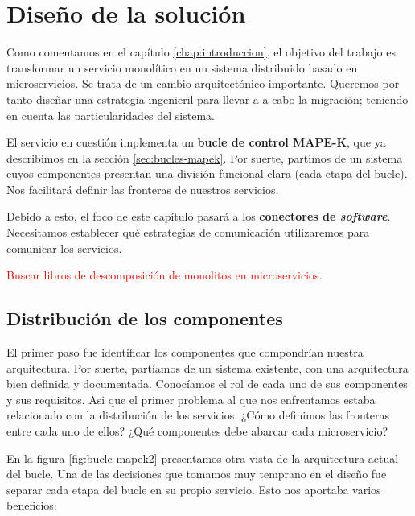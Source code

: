 \chapter{Diseño de la solución}
\label{chap:diseño}

Como comentamos en el capítulo \ref{chap:introduccion}, el objetivo del trabajo es transformar un servicio monolítico en un sistema distribuido basado en microservicios. Se trata de un cambio arquitectónico importante. Queremos por tanto diseñar una estrategia ingenieril para llevar a a cabo la migración; teniendo en cuenta las particularidades del sistema.

El servicio en cuestión implementa un \textbf{bucle de control MAPE-K}\cite{ibmcorporationArchitecturalBlueprintAutonomic2006,fonsServiciosAdaptivereadyPara2021}, que ya describimos en la sección \ref{sec:bucles-mapek}. Por suerte, partimos de un sistema cuyos componentes presentan una división funcional clara (cada etapa del bucle). Nos facilitará definir las fronteras de nuestros servicios.

Debido a esto, el foco de este capítulo pasará a los \textbf{conectores de \emph{software}}. Necesitamos establecer qué estrategias de comunicación utilizaremos para comunicar los servicios.

\textcolor{red}{Buscar libros de descomposición de monolitos en microservicios.}

\section{Distribución de los componentes}

El primer paso fue identificar los componentes que compondrían nuestra arquitectura. Por suerte, partíamos de un sistema existente, con una arquitectura bien definida y documentada. Conocíamos el rol de cada uno de sus componentes y sus requisitos. Asi que el primer problema al que nos enfrentamos estaba relacionado con la distribución de los servicios. ¿Cómo definimos las fronteras entre cada uno de ellos? ¿Qué componentes debe abarcar cada microservicio?

En la figura \ref{fig:bucle-mapek2} presentamos otra vista de la arquitectura actual del bucle. Una de las decisiones que tomamos muy temprano en el diseño fue separar cada etapa del bucle en su propio servicio. Esto nos aportaba varios beneficios:


